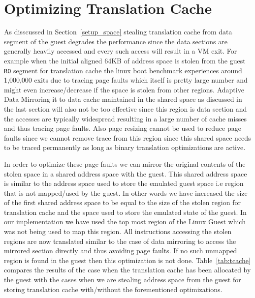 \section{Optimizing Translation Cache}
\label{tcache_optimizations}
As disscussed in Section~\ref{setup_space} stealing translation cache from data segment of the guest degrades the performance since the data sections are generally heavily accessed and every such access will result in a VM exit. For example when the initial aligned 64KB of address space is stolen from the guest {\tt RO} segment for translation cache the linux boot benchmark experiences around 1,000,000 exits due to tracing page faults which itself is pretty large number and might even increase/decrease if the space is stolen from other regions. Adaptive Data Mirroring it to data cache maintained in the shared space as discussed in the last section will also not be too effective since this region is data section and the accesses are typically widespread resulting in a large number of cache misses and thus tracing page faults. Also page resizing cannot be used to reduce page faults since we cannot remove trace from this region since this shared space needs to be traced permanently as long as binary translation optimizations are active.

In order to optimize these page faults we can mirror the original contents of the stolen space in a shared address space with the guest. This shared address space is similar to the address space used to store the emulated guest space i.e region that is not mapped/used by the guest. In other words we have increased the size of the first shared address space to be equal to the size of the stolen region for translation cache and the space used to store the emulated state of the guest. In our implementation we have used the top most region of the Linux Guest which was not being used to map this region. All instructions accessing the stolen regions are now translated similar to the case of data mirroring to access the mirrored section directly and thus avoiding page faults. If no such unmapped region is found in the guest then this optimization is not done. Table~\ref{tab:tcache} compares the results of the case when the translation cache has been allocated by the guest with the cases when we are stealing address space from the guest for storing translation cache with/without the forementioned optimizations.

